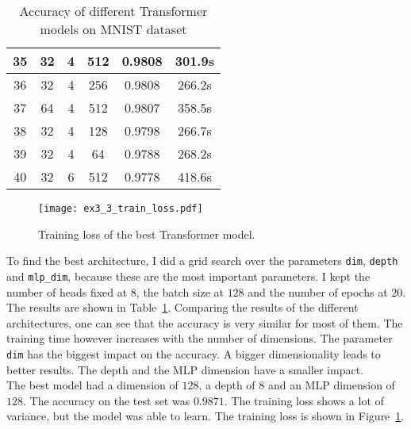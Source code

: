 \begin{table}[htbp]
\begin{center}
\begin{tabular}{|c|c|c|c|c|c|}
      \hline
      35            & 32                    & 4                       & 512                        & 0.9808                     & 301.9s                      \\
      \hline
      36            & 32                    & 4                       & 256                        & 0.9808                     & 266.2s                      \\
      \hline
      37            & 64                    & 4                       & 512                        & 0.9807                     & 358.5s                      \\
      \hline
      38            & 32                    & 4                       & 128                        & 0.9798                     & 266.7s                      \\
      \hline
      39            & 32                    & 4                       & 64                         & 0.9788                     & 268.2s                      \\
      \hline
      40            & 32                    & 6                       & 512                        & 0.9778                     & 418.6s                      \\
      \hline
    \end{tabular}
  \end{center}
  \caption{Accuracy of different Transformer models on MNIST dataset}
  \label{tab:transformer_accuracy}
\end{table}

\begin{figure}
  \centering
  \texttt{[image: ex3\_3\_train\_loss.pdf]}
  \caption{Training loss of the best Transformer model.}
  \label{fig:ex3_3_train_loss}
\end{figure}

To find the best architecture, I did a grid search over the parameters \texttt{dim}, \texttt{depth}
and \texttt{mlp\_dim}, because these are the most important parameters. I kept the number of heads
fixed at $8$, the batch size at $128$ and the number of epochs at $20$. The results are shown in
Table~\ref{tab:transformer_accuracy}. Comparing the results of the different architectures, one can
see that the accuracy is very similar for most of them. The training time however increases with the
number of dimensions. The parameter \texttt{dim} has the biggest impact on the accuracy. A bigger
dimensionality leads to better results. The depth and the MLP dimension have a smaller impact.\\
The best model had a dimension of $128$, a depth of $8$ and an MLP dimension of $128$. The accuracy
on the test set was $0.9871$. The training loss shows a lot of variance, but the model was able to
learn. The training loss is shown in Figure~\ref{fig:ex3_3_train_loss}.
